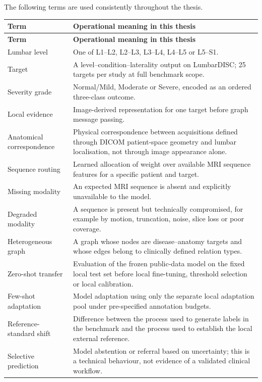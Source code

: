 The following terms are used consistently throughout the thesis.

\begin{longtable}{p{3.6cm}p{10.0cm}}
\toprule
\textbf{Term} & \textbf{Operational meaning in this thesis}\\
\midrule
\endfirsthead
\toprule
\textbf{Term} & \textbf{Operational meaning in this thesis}\\
\midrule
\endhead
Lumbar level & One of L1--L2, L2--L3, L3--L4, L4--L5 or L5--S1.\\
Target & A level--condition--laterality output on LumbarDISC; 25 targets per study at full benchmark scope.\\
Severity grade & Normal/Mild, Moderate or Severe, encoded as an ordered three-class outcome.\\
Local evidence & Image-derived representation for one target before graph message passing.\\
Anatomical correspondence & Physical correspondence between acquisitions defined through DICOM patient-space geometry and lumbar localisation, not through image appearance alone.\\
Sequence routing & Learned allocation of weight over available MRI sequence features for a specific patient and target.\\
Missing modality & An expected MRI sequence is absent and explicitly unavailable to the model.\\
Degraded modality & A sequence is present but technically compromised, for example by motion, truncation, noise, slice loss or poor coverage.\\
Heterogeneous graph & A graph whose nodes are disease--anatomy targets and whose edges belong to clinically defined relation types.\\
Zero-shot transfer & Evaluation of the frozen public-data model on the fixed local test set before local fine-tuning, threshold selection or local calibration.\\
Few-shot adaptation & Model adaptation using only the separate local adaptation pool under pre-specified annotation budgets.\\
Reference-standard shift & Difference between the process used to generate labels in the benchmark and the process used to establish the local external reference.\\
Selective prediction & Model abstention or referral based on uncertainty; this is a technical behaviour, not evidence of a validated clinical workflow.\\
\bottomrule
\end{longtable}

